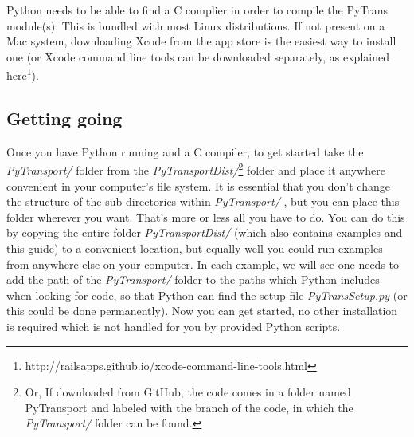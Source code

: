 \documentclass[10pt,
amsmath,amssymb,
aps,prd,nofootinbib,eqsecnum,a4paper]{revtex4}
\newcommand{\CC}{C\nolinebreak\hspace{-.05em}\raisebox{.4ex}{\tiny\bf +}\nolinebreak\hspace{-.10em}\raisebox{.4ex}{\tiny\bf +}}
\def\CC{{C\nolinebreak[4]\hspace{-.05em}\raisebox{.4ex}{\tiny\bf ++}}}
\def\S{ }
\begin{document}
\vspace{0.2cm}
\noindent {\bf \CC \S  complier:}
Python needs to be able to find a \CC \S  complier in order to compile the PyTrans module(s). This is bundled with most 
Linux distributions. If not present on a Mac system, downloading Xcode from the app store is the easiest way to 
install one (or Xcode command line tools can be downloaded separately, as explained \href{http://railsapps.github.io/xcode-command-line-tools.html}{here}\footnote{http://railsapps.github.io/xcode-command-line-tools.html}).

\subsection{Getting going}

\noindent  Once you have Python running and a \CC \S compiler, to get started take the {\it PyTransport/} folder from the 
{\it PyTransportDist/}\footnote{Or, If downloaded from GitHub, the code comes in a folder named PyTransport and labeled with the branch of the code, in which the {\it PyTransport/} folder can be found.} folder and place it 
anywhere convenient in your computer's file system. It is essential that you don't change 
the structure of the sub-directories within {\it PyTransport/} , but you can place this folder wherever you want.  
That's more or less all you have to do.
You can do this by copying the entire folder {\it PyTransportDist/} (which 
also contains examples and this guide) to a convenient location, but equally well you could run examples from 
anywhere else on your computer. In each example, we will see one needs to add the path of  
the {\it PyTransport/} folder to the paths which Python includes when looking for code, so that Python can 
find the setup file 
{\it PyTransSetup.py} (or this could be done permanently). Now you can get started, no other installation is required which is not handled for you by provided 
Python scripts.
\end{document}
